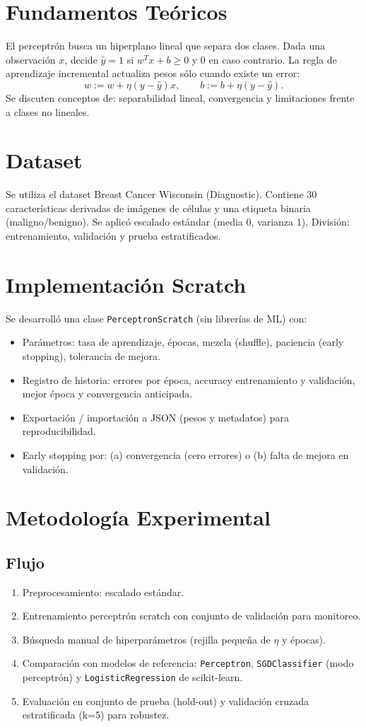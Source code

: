 \graphicspath{{./}}\GenerarPortada

\section{Fundamentos Teóricos}
El perceptrón busca un hiperplano lineal que separa dos clases. Dada una observación $x$, decide $\hat{y}=1$ si $w^Tx + b \ge 0$ y $0$ en caso contrario. La regla de aprendizaje incremental actualiza pesos sólo cuando existe un error: 
\[ w := w + \eta (y - \hat{y}) x, \qquad b := b + \eta (y - \hat{y}). \]
Se discuten conceptos de: separabilidad lineal, convergencia y limitaciones frente a clases no lineales.

\section{Dataset}
Se utiliza el dataset Breast Cancer Wisconsin (Diagnostic). Contiene 30 características derivadas de imágenes de células y una etiqueta binaria (maligno/benigno). Se aplicó escalado estándar (media 0, varianza 1). División: entrenamiento, validación y prueba estratificados.

\section{Implementación Scratch}
Se desarrolló una clase \texttt{PerceptronScratch} (sin librerías de ML) con:
\begin{itemize}
	\item Parámetros: tasa de aprendizaje, épocas, mezcla (shuffle), paciencia (early stopping), tolerancia de mejora.
	\item Registro de historia: errores por época, accuracy entrenamiento y validación, mejor época y convergencia anticipada.
	\item Exportación / importación a JSON (pesos y metadatos) para reproducibilidad.
	\item Early stopping por: (a) convergencia (cero errores) o (b) falta de mejora en validación.
\end{itemize}

\section{Metodología Experimental}
\subsection{Flujo}
\begin{enumerate}
	\item Preprocesamiento: escalado estándar.
	\item Entrenamiento perceptrón scratch con conjunto de validación para monitoreo.
	\item Búsqueda manual de hiperparámetros (rejilla pequeña de $\eta$ y épocas).
	\item Comparación con modelos de referencia: \texttt{Perceptron}, \texttt{SGDClassifier} (modo perceptrón) y \texttt{LogisticRegression} de scikit-learn.
	\item Evaluación en conjunto de prueba (hold-out) y validación cruzada estratificada (k=5) para robustez.
\end{enumerate}
